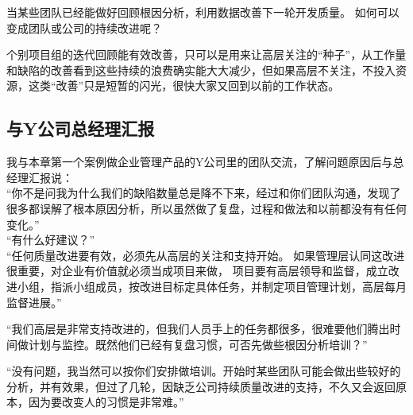 当某些团队已经能做好回顾根因分析，利用数据改善下一轮开发质量。
如何可以变成团队或公司的持续改进呢？



个别项目组的迭代回顾能有效改善，只可以是用来让高层关注的``种子''，从工作量和缺陷的改善看到这些持续的浪费确实能大大减少，但如果高层不关注，不投入资源，这类``改善''只是短暂的闪光，很快大家又回到以前的工作状态。

\hypertarget{ux4e0eyux516cux53f8ux603bux7ecfux7406ux6c47ux62a5}{%
\subsection{与Y公司总经理汇报}\label{ux4e0eyux516cux53f8ux603bux7ecfux7406ux6c47ux62a5}}

我与本章第一个案例做企业管理产品的Y公司里的团队交流，了解问题原因后与总经理汇报说：\\
``你不是问我为什么我们的缺陷数量总是降不下来，经过和你们团队沟通，发现了很多都误解了根本原因分析，所以虽然做了复盘，过程和做法和以前都没有有任何变化。''\\
``有什么好建议？''\\
``任何质量改进要有效，必须先从高层的关注和支持开始。
如果管理层认同这改进很重要，对企业有价值就必须当成项目来做，
项目要有高层领导和监督，成立改进小组，指派小组成员，按改进目标定具体任务，并制定项目管理计划，高层每月监督进展。''

``我们高层是非常支持改进的，但我们人员手上的任务都很多，很难要他们腾出时间做计划与监控。既然他们已经有复盘习惯，可否先做些根因分析培训？''

``没有问题，我当然可以按你们安排做培训。开始时某些团队可能会做出些较好的分析，并有效果，但过了几轮，因缺乏公司持续质量改进的支持，不久又会返回原本，因为要改变人的习惯是非常难。''

